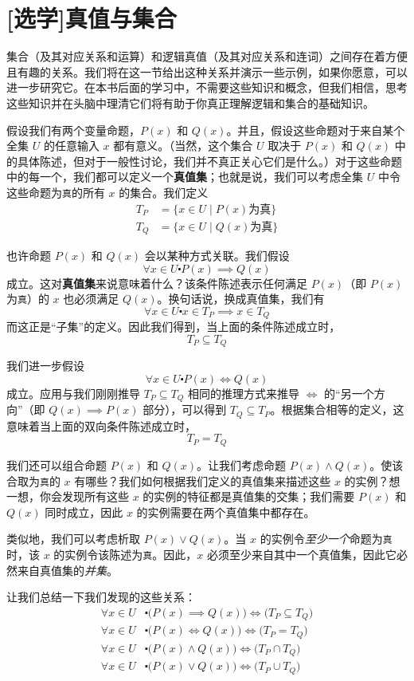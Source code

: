 \section[真值与集合]{[选学]真值与集合}

集合（及其对应关系和运算）和逻辑真值（及其对应关系和连词）之间存在着方便且有趣的关系。我们将在这一节给出这种关系并演示一些示例，如果你愿意，可以进一步研究它。在本书后面的学习中，不需要这些知识和概念，但我们相信，思考这些知识并在头脑中理清它们将有助于你真正理解逻辑和集合的基础知识。

假设我们有两个变量命题，$P(x)$ 和 $Q(x)$。并且，假设这些命题对于来自某个全集 $U$ 的任意输入 $x$ 都有意义。（当然，这个集合 $U$ 取决于 $P(x)$ 和 $Q(x)$ 中的具体陈述，但对于一般性讨论，我们并不真正关心它们是什么。）对于这些命题中的每一个，我们都可以定义一个\textbf{真值集}；也就是说，我们可以考虑全集 $U$ 中令这些命题为\verb|真|的所有 $x$ 的集合。我们定义
\begin{align*}
    T_P &= \{x \in U \mid P(x) \text{为真}\} \\
    T_Q &= \{x \in U \mid Q(x) \text{为真}\}
\end{align*}

也许命题 $P(x)$ 和 $Q(x)$ 会以某种方式关联。我们假设
\[\forall x \in U \centerdot P(x) \implies Q(x)\]
成立。这对\textbf{真值集}来说意味着什么？该条件陈述表示任何满足 $P(x)$（即 $P(x)$ 为\verb|真|）的 $x$ 也必须满足 $Q(x)$。换句话说，换成真值集，我们有
\[\forall x \in U \centerdot x \in T_P \implies x \in T_Q\]
而这正是``子集''的定义。因此我们得到，当上面的条件陈述成立时，
\[T_P \subseteq T_Q\]

我们进一步假设
\[\forall x \in U \centerdot P(x) \iff Q(x)\]
成立。应用与我们刚刚推导 $T_P \subseteq T_Q$ 相同的推理方式来推导 $\iff$ 的``另一个方向''（即 $Q(x) \implies P(x)$ 部分），可以得到 $T_Q \subseteq T_P$。根据集合相等的定义，这意味着当上面的双向条件陈述成立时，
\[T_P = T_Q\]

我们还可以组合命题 $P(x)$ 和 $Q(x)$。让我们考虑命题 $P(x) \land Q(x)$。使该合取为\verb|真|的 $x$ 有哪些？我们如何根据我们定义的真值集来描述这些 $x$ 的实例？想一想，你会发现所有这些 $x$ 的实例的特征都是真值集的交集；我们需要 $P(x)$ 和 $Q(x)$ 同时成立，因此 $x$ 的实例需要在两个真值集中都存在。

类似地，我们可以考虑析取 $P(x) \lor Q(x)$。当 $x$ 的实例令\emph{至少一个}命题为\verb|真|时，该 $x$ 的实例令该陈述为\verb|真|。因此，$x$ 必须至少来自其中一个真值集，因此它必然来自真值集的\emph{并集}。

让我们总结一下我们发现的这些关系：
\begin{align*}
    \forall x \in U & \centerdot \big(P(x) \implies Q(x)\big) \iff \big(T_P \subseteq T_Q \big) \\
    \forall x \in U & \centerdot \big(P(x) \iff Q(x)\big) \iff \big(T_P = T_Q \big) \\
    \forall x \in U & \centerdot \big(P(x) \land Q(x)\big) \iff \big(T_P \cap T_Q \big) \\
    \forall x \in U & \centerdot \big(P(x) \lor Q(x)\big) \iff \big(T_P \cup T_Q \big) 
\end{align*}

